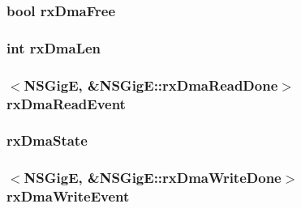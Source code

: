 \label{classNSGigE_ad2ec4911ac2ba9d13946d044e0a7ec11}
\hypertarget{classNSGigE_ac5da2b90c6468f1f5f85404aab8fd314}{
\subsubsection[{rxDmaFree}]{\setlength{\rightskip}{0pt plus 5cm}bool {\bf rxDmaFree}}}
\label{classNSGigE_ac5da2b90c6468f1f5f85404aab8fd314}
\hypertarget{classNSGigE_afe607a5f463bca368d7fe1e57d15a03c}{
\subsubsection[{rxDmaLen}]{\setlength{\rightskip}{0pt plus 5cm}int {\bf rxDmaLen}}}
\label{classNSGigE_afe607a5f463bca368d7fe1e57d15a03c}
\hypertarget{classNSGigE_a61b576743cc2713534c8a66b5d4a85dc}{
\subsubsection[{rxDmaReadEvent}]{$<${\bf NSGigE}, \&NSGigE::rxDmaReadDone$>$ {\bf rxDmaReadEvent}}}
\label{classNSGigE_a61b576743cc2713534c8a66b5d4a85dc}
\hypertarget{classNSGigE_a0f3e75fcacc89ec2341d356fd41b41d6}{
\subsubsection[{rxDmaState}]{ {\bf rxDmaState}}}
\label{classNSGigE_a0f3e75fcacc89ec2341d356fd41b41d6}
\hypertarget{classNSGigE_a6a23fd3bead30e970d3408878ab65300}{
\subsubsection[{rxDmaWriteEvent}]{$<${\bf NSGigE}, \&NSGigE::rxDmaWriteDone$>$ {\bf rxDmaWriteEvent}}}
